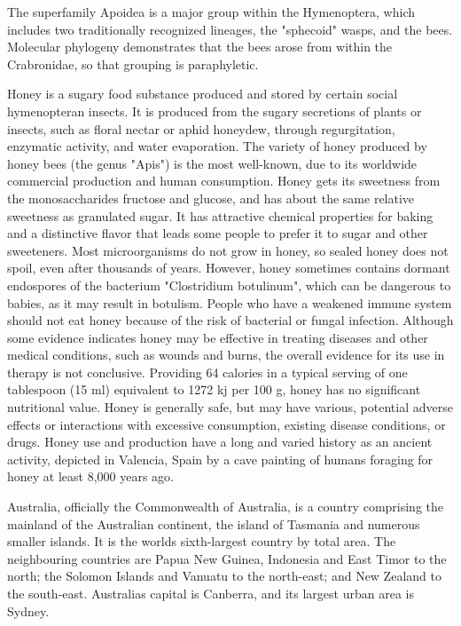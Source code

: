 \documentclass{article} \usepackage{iclr2019_conference,times}
\begin{document}
The superfamily Apoidea is a major group within the Hymenoptera, which includes two traditionally recognized lineages, the "sphecoid" wasps, and the bees. Molecular phylogeny demonstrates that the bees arose from within the Crabronidae, so that grouping is paraphyletic.

Honey is a sugary food substance produced and stored by certain social hymenopteran insects. It is produced from the sugary secretions of plants or insects, such as floral nectar or aphid honeydew, through regurgitation, enzymatic activity, and water evaporation. The variety of honey produced by honey bees (the genus "Apis") is the most well-known, due to its worldwide commercial production and human consumption.
Honey gets its sweetness from the monosaccharides fructose and glucose, and has about the same relative sweetness as granulated sugar. It has attractive chemical properties for baking and a distinctive flavor that leads some people to prefer it to sugar and other sweeteners. Most microorganisms do not grow in honey, so sealed honey does not spoil, even after thousands of years. However, honey sometimes contains dormant endospores of the bacterium "Clostridium botulinum", which can be dangerous to babies, as it may result in botulism.
People who have a weakened immune system should not eat honey because of the risk of bacterial or fungal infection. Although some evidence indicates honey may be effective in treating diseases and other medical conditions, such as wounds and burns, the overall evidence for its use in therapy is not conclusive. Providing 64 calories in a typical serving of one tablespoon (15 ml) equivalent to 1272 kj per 100 g, honey has no significant nutritional value. Honey is generally safe, but may have various, potential adverse effects or interactions with excessive consumption, existing disease conditions, or drugs.
Honey use and production have a long and varied history as an ancient activity, depicted in Valencia, Spain by a cave painting of humans foraging for honey at least 8,000 years ago.

Australia, officially the Commonwealth of Australia, is a country comprising the mainland of the Australian continent, the island of Tasmania and numerous smaller islands. It is the worlds sixth-largest country by total area. The neighbouring countries are Papua New Guinea, Indonesia and East Timor to the north; the Solomon Islands and Vanuatu to the north-east; and New Zealand to the south-east. Australias capital is Canberra, and its largest urban area is Sydney.
\end{document}
